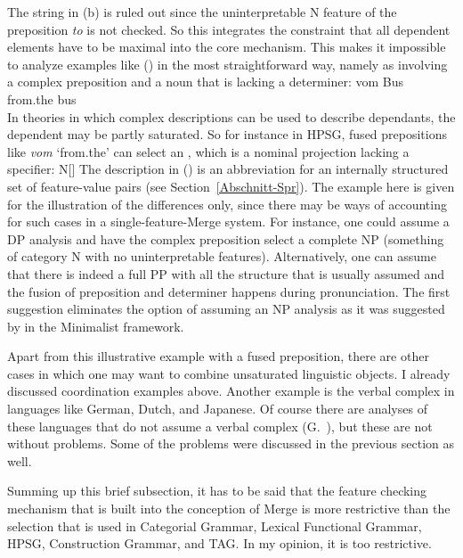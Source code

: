 The string in (b) is ruled out since the uninterpretable N feature of the preposition
\emph{to} is not checked. So this integrates the constraint that all
dependent elements have to be maximal into the core mechanism. This makes it impossible to analyze examples like ()
in the most straightforward way, namely as involving a complex preposition and a noun that is lacking
a determiner:
\ea
\gll vom Bus\\
     from.the bus\\
\z
In theories in which complex descriptions can be used to describe dependants, the dependent may be
partly saturated. So for instance in HPSG, fused prepositions like \emph{vom} `from.the' can select an \nbar,
which is a nominal projection lacking a specifier:
\ea
N[\spr {}]
\z
The description in () is an abbreviation for an internally structured set of feature-value
pairs (see Section~\ref{Abschnitt-Spr}). The example here is given for the illustration of the
differences only, since there may be ways of accounting for such cases in a single-feature-Merge
system. For instance, one could assume a DP analysis and have the complex preposition select a complete NP
(something of category N with no uninterpretable features). Alternatively, one can assume that there is indeed a full PP
with all the structure that is usually assumed and the fusion of preposition and determiner happens
during pronunciation. The first suggestion eliminates the option of assuming an NP analysis as it
was suggested by \citet{Bruening2009a} in the Minimalist framework.

\addlines[-1]
Apart from this illustrative example with a fused preposition, there are other cases in which one may want to combine unsaturated
linguistic objects. I already discussed coordination examples above. Another example is the verbal
complex in languages like German, Dutch, 
and Japanese. 
Of course there are analyses of these languages
that do not assume a verbal complex (G.\ \citealp{GMueller98a,Wurmbrand2003b}), but these are not without problems. Some of the problems were
discussed in the previous section as well.

Summing up this brief subsection, it has to be said that the feature checking mechanism that is
built into the conception of Merge is more restrictive than the selection that is used in Categorial
Grammar, Lexical Functional Grammar, HPSG, Construction Grammar, and TAG. In my opinion, it is too restrictive.

